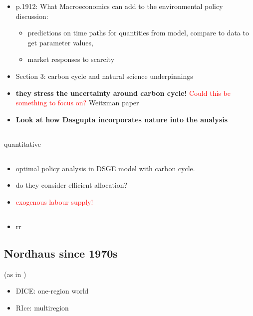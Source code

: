 \documentclass[12pt]{article}
\newcommand{\tr}[1]{\textcolor{red}{#1}}
\begin{document}
\begin{itemize}
\begin{itemize}
	 	\end{itemize}
\item p.1912: What Macroeconomics can add to the environmental policy discussion: 
 	\begin{itemize}
	\item predictions on time paths for quantities from model, compare to data to get parameter values, 
	\item market responses to scarcity
 	\end{itemize}
 \item Section 3: carbon cycle and natural science underpinnings
 \item \textbf{they stress the uncertainty around carbon cycle!} \tr{Could this be something to focus on?} Weitzman paper
 \item \textbf{Look at how Dasgupta incorporates nature into the analysis}
	 	
\end{itemize}
 \subsection{\cite{Acemoglu2016TransitionTechnology}} quantitative
 \subsection{\cite{Golosov2014OptimalEquilibrium}}
 
 \begin{itemize}
 	\item optimal policy analysis in DSGE model with carbon cycle.
 	\item do they consider efficient allocation?
 	\item \tr{exogenous labour supply!}
 \end{itemize}
\subsection{\cite{Bovenberg2002EnvironmentalRegulation}}
\begin{itemize}
	\item rr
\end{itemize}
\subsection{Nordhaus since 1970s \citep{Nordhaus2018ProjectionsPolicies}} (as in \cite{Hassler2016EnvironmentalMacroeconomics})
\begin{itemize}
\item DICE: one-region world
\item RIce: multiregion
\end{itemize}
\end{document}
